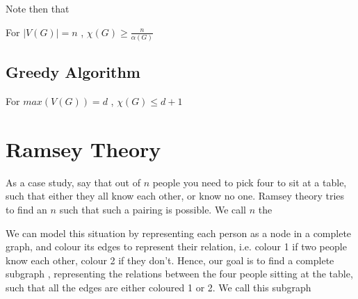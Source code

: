 \documentclass[english,course]{Notes}
\begin{document}
\par{Note then that

\begin{theorem}{For $|V(G)| = n$ , $\chi(G) \geq \frac{n}{\alpha(G)}$}\end{theorem}
\proofs{}


\subsection{Greedy Algorithm}

\begin{lemma}{For $max(V(G)) = d$ , $\chi(G) \leq d + 1$}\end{lemma}

\proofs{}

\section{Ramsey Theory}

\par{As a case study, say that out of $n$ people you need to pick four to sit at a table, such that either they all know each other, or know no one. Ramsey theory tries to find an $n$ such that such a pairing is possible. We call $n$ the }

\par{We can model this situation by representing each person as a node in a complete graph, and colour its edges to represent their relation, i.e. colour 1 if two people know each other, colour 2 if they don't. Hence, our goal is to find a complete subgraph , representing the relations between the four people sitting at the table, such that all the edges are either coloured 1 or 2. We call this subgraph 





}}
\end{document}
